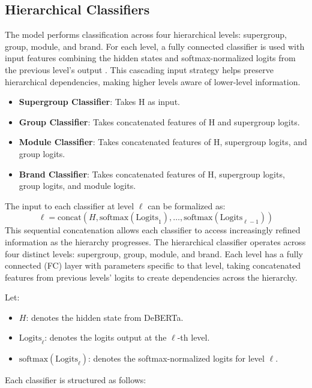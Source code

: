 \documentclass[9pt,a4paper,twoside]{rho-class/rho}
\begin{document}
      \subsection{Hierarchical Classifiers}

        The model performs classification across four hierarchical levels: supergroup, group, module, and brand. For each level, a fully connected classifier is used with input features combining the hidden states and softmax-normalized logits from the previous level’s output \cite{mohammed2018effectiveness}. This cascading input strategy helps preserve hierarchical dependencies, making higher levels aware of lower-level information.

\begin{itemize}
    \item \textbf{Supergroup Classifier}: Takes H as input.
    \item \textbf{Group Classifier}: Takes concatenated features of H and supergroup logits.
    \item \textbf{Module Classifier}: Takes concatenated features of H, supergroup logits, and group logits.
    \item \textbf{Brand Classifier}: Takes concatenated features of H, supergroup logits, group logits, and module logits.
\end{itemize}
The input to each classifier at level $ \ell $  can be formalized as:
\[
\ell = \text{concat}(H, \text{softmax}(\text{Logits}_1), \ldots, \text{softmax}(\text{Logits}_{\ell-1}))
\]
This sequential concatenation allows each classifier to access increasingly refined information as the hierarchy progresses. The hierarchical classifier operates across four distinct levels: supergroup, group, module, and brand. Each level has a fully connected (FC) layer with parameters specific to that level, taking concatenated features from previous levels’ logits to create dependencies across the hierarchy.

Let:

\begin{itemize}
    \item $H$: denotes the hidden state from DeBERTa.
    \item $\text{Logits}_\ell$: denotes the logits output at the $\ell$-th level.
    \item $\text{softmax}(\text{Logits}_\ell)$: denotes the softmax-normalized logits for level $\ell$.
\end{itemize}
Each classifier is structured as follows:
\end{document}
